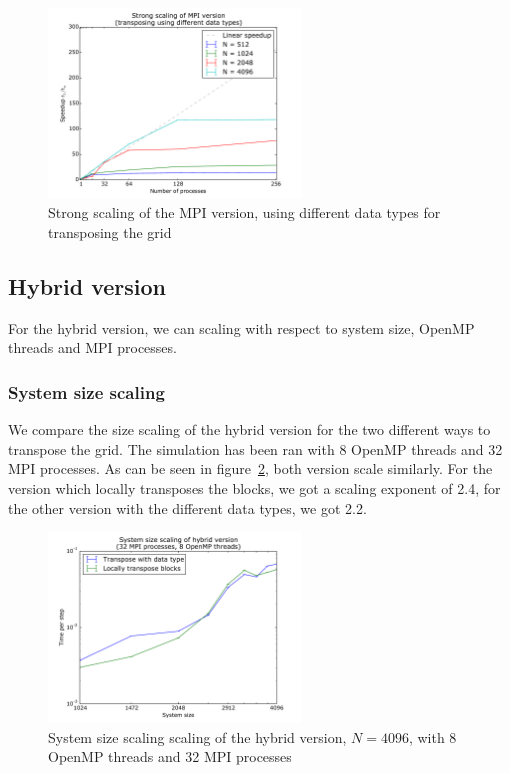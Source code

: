 \documentclass[a4paper]{article}
\begin{document}
\begin{figure}
	\centering
	\includegraphics[width=0.6\textwidth]{mpi_data_strong_scaling_vs_1proc.pdf}
	\caption{Strong scaling of the MPI version, using different data types for transposing the grid}
	\label{fig:mpi-strong-scaling-data}
\end{figure}


\subsection{Hybrid version}
For the hybrid version, we can scaling with respect to system size, OpenMP threads and MPI processes.

\subsubsection{System size scaling}
We compare the size scaling of the hybrid version for the two different ways to transpose the grid.
The simulation has been ran with 8 OpenMP threads and 32 MPI processes.
As can be seen in figure~\ref{fig:hybrid-size-scaling}, both version scale similarly.
For the version which locally transposes the blocks, we got a scaling exponent of 2.4, for the other version with the different data types, we got 2.2.

\begin{figure}
	\centering
	\includegraphics[width=0.6\textwidth]{hybrid_size_scaling.pdf}
	\caption{System size scaling scaling of the hybrid version, $N=4096$, with 8 OpenMP threads and 32 MPI processes}
	\label{fig:hybrid-size-scaling}
\end{figure}
\end{document}
